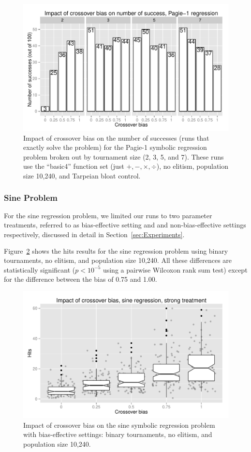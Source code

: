 \documentclass{sig-alternate}
\begin{document}
\begin{figure}
\centering
\includegraphics[width=0.45 \textwidth]{Plots/Pagie_1_Strong_Successes_vs_Bias.pdf}
\caption{Impact of crossover bias on the number of successes (runs that exactly solve the problem) for the Pagie-1
symbolic regression problem broken out by tournament size (2, 3, 5, and 7). These runs use the ``basic4'' function set
(just $+, -, \times, \div$), no elitism, population size 10,240, and Tarpeian bloat control.}
\label{fig:Pagie1StrongSuccesses}
\end{figure}

\subsubsection{Sine Problem}

For the sine regression problem, we limited our runs to two parameter treatments, referred to as bias-effective setting
and and non-bias-effective settings respectively, discussed in detail in Section~\ref{sec:Experiments}.

Figure~\ref{fig:sineBiasResultsStrong} shows the hits results for the sine regression problem using binary tournaments,
no elitism, and population size 10,240. All these differences are statistically significant ($p < 10^{-5}$ using a
pairwise Wilcoxon rank sum test) except for the difference between the bias of 0.75 and 1.00.

\begin{figure}
\centering
\includegraphics[width=0.45 \textwidth]{Plots/Sine_XO_impact_strong_boxplot.pdf}
\caption{Impact of crossover bias on the sine symbolic regression problem with bias-effective settings: binary
tournaments, no elitism, and population size 10,240.}
\label{fig:sineBiasResultsStrong}
\end{figure}
\end{document}
